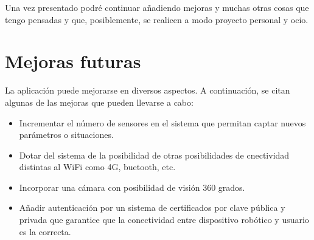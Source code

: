 Una vez presentado podré continuar añadiendo mejoras y muchas otras cosas que tengo pensadas y que, posiblemente, se realicen a modo proyecto personal y ocio.\\

\section{Mejoras futuras}
\label{sec:mejoras_futuras}

La aplicación puede mejorarse en diversos aspectos. A continuación, se citan algunas de las mejoras que pueden llevarse a cabo:

\begin{itemize}
  \item Incrementar el número de sensores en el sistema que permitan captar nuevos parámetros o situaciones.
  \item Dotar del sistema de la posibilidad de otras posibilidades de cnectividad distintas al WiFi como 4G, buetooth, etc.
  \item Incorporar una cámara con posibilidad de visión 360 grados.
  \item Añadir autenticación por un sistema de certificados por clave pública y privada que garantice que la conectividad entre dispositivo robótico y usuario es la correcta.
\end{itemize}

